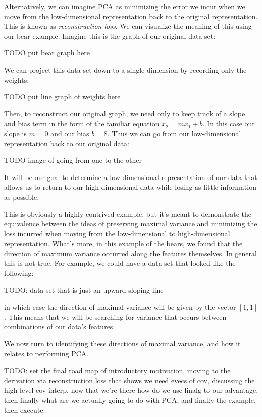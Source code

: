 Alternatively, we can imagine PCA as minimizing the error we incur when we move from the low-dimensional representation back to the original representation. This is known as \textit{reconstruction loss}. We can visualize the meaning of this using our bear example. Imagine this is the graph of our original data set:

TODO put bear graph here

We can project this data set down to a single dimension by recording only the weights:

TODO put line graph of weights here

Then, to reconstruct our original graph, we need only to keep track of a slope and bias term in the form of the familiar equation $x_2 = mx_1 + b$. In this case our slope is $m=0$ and our bias $b=8$. Thus we can go from our low-dimensional representation back to our original data:

TODO image of going from one to the other

It will be our goal to determine a low-dimensional representation of our data that allows us to return to our high-dimensional data while losing as little information as possible.

This is obviously a highly contrived example, but it's meant to demonstrate the equivalence between the ideas of preserving maximal variance and minimizing the loss incurred when moving from the low-dimensional to high-dimensional representation. What's more, in this example of the bears, we found that the direction of maximum variance occurred along the features themselves. In general this is not true. For example, we could have a data set that looked like the following:

TODO: data set that is just an upward sloping line

in which case the direction of maximal variance will be given by the vector $[1, 1]$. This means that we will be searching for variance that occurs between combinations of our data's features.

We now turn to identifying these directions of maximal variance, and how it relates to performing PCA.

TODO: set the final road map of introductory motivation, moving to the derivation via reconstruction loss that shows we need evecs of cov, discussing the high-level cov interp, now that we're there how do we use linalg to our advantage, then finally what are we actually going to do with PCA, and finally the example. then execute.

